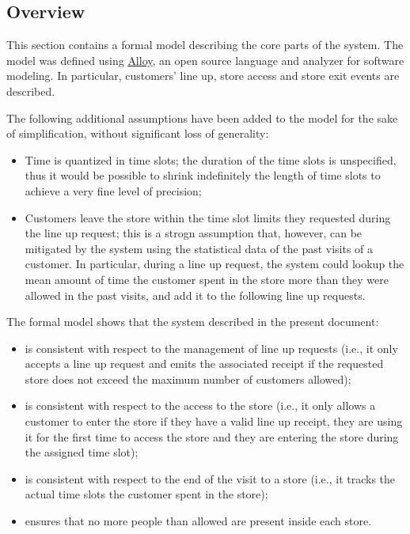 \documentclass[../../main.tex]{subfiles}
\begin{document}
\subsection{Overview}

This section contains a formal model describing the core parts of the system. The model was defined using \href{https://alloytools.org/}{Alloy}, an open source language and analyzer for software modeling. In particular, customers' line up, store access and store exit events are described.

The following additional assumptions have been added to the model for the sake of simplification, without significant loss of generality:
\begin{itemize}
  \item Time is quantized in time slots; the duration of the time slots is unspecified, thus it would be possible to shrink indefinitely the length of time slots to achieve a very fine level of precision;
  \item Customers leave the store within the time slot limits they requested during the line up request; this is a strogn assumption that, however, can be mitigated by the system using the statistical data of the past visits of a customer. In particular, during a line up request, the system could lookup the mean amount of time the customer spent in the store more than they were allowed in the past visits, and add it to the following line up requests.
\end{itemize}

The formal model shows that the system described in the present document:
\begin{itemize}
  \item is consistent with respect to the management of line up requests (i.e., it only accepts a line up request and emits the associated receipt if the requested store does not exceed the maximum number of customers allowed);
  \item is consistent with respect to the access to the store (i.e., it only allows a customer to enter the store if they have a valid line up receipt, they are using it for the first time to access the store and they are entering the store during the assigned time slot);
  \item is consistent with respect to the end of the visit to a store (i.e., it tracks the actual time slots the customer spent in the store);
  \item ensures that no more people than allowed are present inside each store.
\end{itemize}
\end{document}
